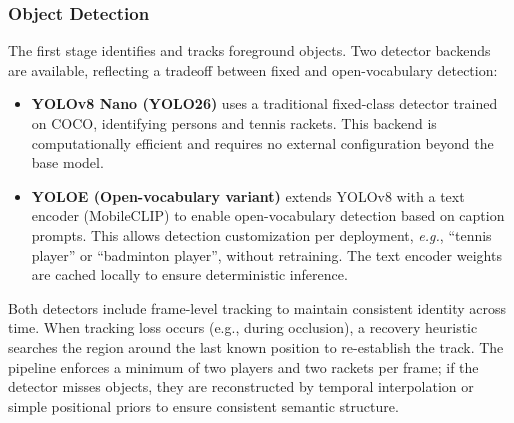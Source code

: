 \documentclass[manuscript, screen]{acmart}
\newcommand{\eg}{\emph{e.g.}, }
\begin{document}
\subsubsection{Object Detection}
The first stage identifies and tracks foreground objects. Two detector backends are available, reflecting a tradeoff between fixed and open-vocabulary detection:
\begin{itemize}[topsep=0pt,itemsep=0pt,leftmargin=*]
    \item \textbf{YOLOv8 Nano (YOLO26)} uses a traditional fixed-class detector trained on COCO, identifying persons and tennis rackets. This backend is computationally efficient and requires no external configuration beyond the base model.
    \item \textbf{YOLOE (Open-vocabulary variant)} extends YOLOv8 with a text encoder (MobileCLIP) to enable open-vocabulary detection based on caption prompts. This allows detection customization per deployment, \eg ``tennis player'' or ``badminton player'', without retraining. The text encoder weights are cached locally to ensure deterministic inference.
\end{itemize}
Both detectors include frame-level tracking to maintain consistent identity across time. When tracking loss occurs (e.g., during occlusion), a recovery heuristic searches the region around the last known position to re-establish the track. The pipeline enforces a minimum of two players and two rackets per frame; if the detector misses objects, they are reconstructed by temporal interpolation or simple positional priors to ensure consistent semantic structure.
\end{document}
